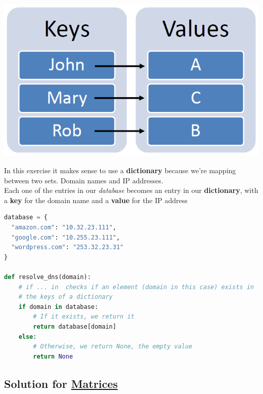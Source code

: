 \documentclass{tufte-handout}
\begin{document}
\begin{marginfigure}%
  \includegraphics[width=\linewidth]{dict.png}
  \caption{In this exercise it makes sense to use a \textbf{dictionary} because
    we're mapping between two sets.  Domain names and IP addresses. \\
    Each one of the entries in our \textit{database} becomes an entry in our
    \textbf{dictionary}, with a \textbf{key} for the domain name and a
    \textbf{value} for the IP address}
  \label{fig:marginfig}
\end{marginfigure}

\begin{lstlisting}[language=Python]
database = {
  "amazon.com": "10.32.23.111",
  "google.com": "10.255.23.111",
  "wordpress.com": "253.32.23.31"
}

def resolve_dns(domain):
    # if ... in  checks if an element (domain in this case) exists in
    # the keys of a dictionary
    if domain in database:
        # If it exists, we return it
        return database[domain]
    else:
        # Otherwise, we return None, the empty value
        return None
\end{lstlisting}

\pagebreak

\subsection{Solution for \hyperref[sec:matrices]{Matrices}}
\end{document}
